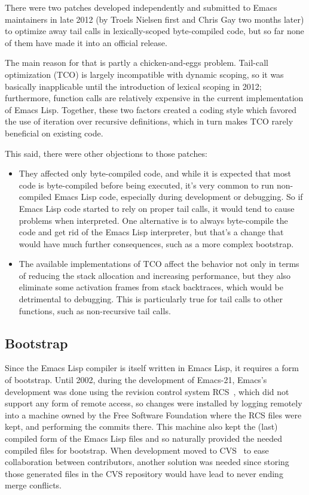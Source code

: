 \documentclass[format=acmsmall, review]{acmart}
\newcommand \Elisp {Emacs Lisp}
\begin{document}
There were two patches developed independently and submitted to Emacs
maintainers in late 2012 (by Troels Nielsen first and Chris Gay two months
later) to optimize away tail calls in lexically-scoped byte-compiled code,
but so far none of them have made it into an official release.

The main reason for that is partly a chicken-and-eggs problem.  Tail-call
optimization (TCO) is largely incompatible with dynamic scoping, so it was
basically inapplicable until the introduction of lexical scoping in 2012;
furthermore, function calls are relatively expensive in the current
implementation of \Elisp{}.  Together, these two factors created a coding
style which favored the use of iteration over recursive definitions, which
in turn makes TCO rarely beneficial on existing code.

This said, there were other objections to those patches:
\begin{itemize}
\item They affected only byte-compiled code, and while it is expected that
  most code is byte-compiled before being executed, it's very common to run
  non-compiled \Elisp{} code, especially during development or debugging.
  So if \Elisp{} code started to rely on proper tail calls, it would tend to cause problems
  when interpreted.  One alternative is to always byte-compile the code and
  get rid of the \Elisp{} interpreter, but that's a change that would have
  much further consequences, such as a more complex bootstrap.
\item The available implementations of TCO affect the behavior not only in
  terms of reducing the stack
  allocation and increasing performance, but they also eliminate some
  activation frames from stack backtraces, which would be detrimental to
  debugging.  This is particularly true for tail calls to
  other functions, such as non-recursive tail calls.
\end{itemize}

\subsection{Bootstrap}
\label{sec:bootstrap}

Since the \Elisp{} compiler is itself written in \Elisp{}, it requires
a form of bootstrap.  Until 2002, during the development of Emacs-21, Emacs's
development was done using the revision control system RCS~\cite{Tichy85},
which did not support any form of remote access, so
changes were installed by logging remotely into a machine owned by the
Free Software Foundation where the RCS files were kept, and
performing the commits there.  This machine also kept the (last) compiled
form of the \Elisp{} files and so naturally provided the needed compiled
files for bootstrap.  When development moved to CVS~\cite{Berliner90} to ease
collaboration between contributors, another solution was needed since
storing those generated files in the CVS repository
would have lead to never ending merge conflicts.
\end{document}
